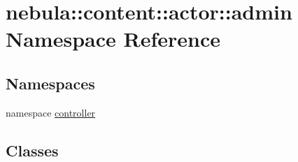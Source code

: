 \hypertarget{namespacenebula_1_1content_1_1actor_1_1admin}{
\section{nebula::content::actor::admin Namespace Reference}
\label{namespacenebula_1_1content_1_1actor_1_1admin}
}
\subsection*{Namespaces}
\begin{DoxyCompactItemize}
\item 
namespace \hyperlink{namespacenebula_1_1content_1_1actor_1_1admin_1_1controller}{controller}
\end{DoxyCompactItemize}
\subsection*{Classes}

